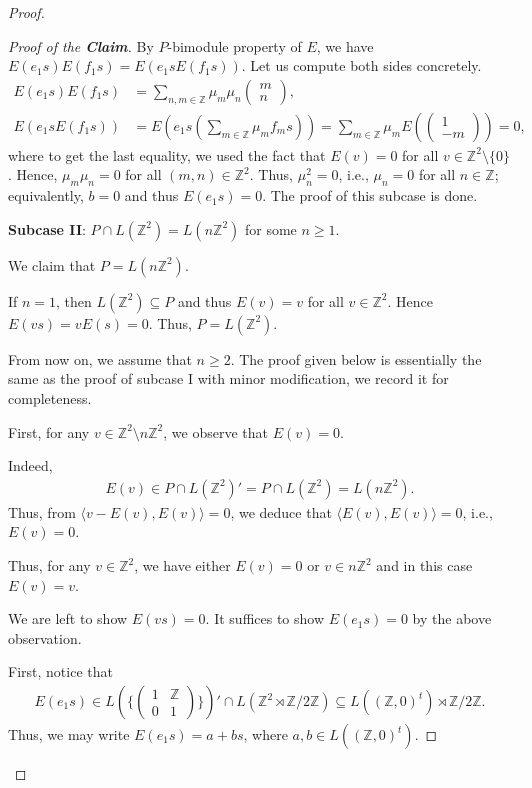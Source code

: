 \documentclass[12pt]{amsart}
\theoremstyle{definition}
\theoremstyle{remark}
\begin{document}
\begin{proof}
\begin{proof}[Proof of the \textbf{Claim}]
By $P$-bimodule property of $E$, we have $E(e_1s)E(f_1s)=E(e_1sE(f_1s))$. Let us compute both sides concretely.
\begin{align*}
E(e_1s)E(f_1s)&=\sum_{n, m\in\mathbb{Z}}\mu_m\mu_n\begin{pmatrix}
m\\n
\end{pmatrix} ,\\
E(e_1sE(f_1s))&=E(e_1s(\sum_{m\in\mathbb{Z}}\mu_mf_ms))=\sum_{m\in\mathbb{Z}}\mu_mE(\begin{pmatrix}
1\\
-m
\end{pmatrix})=0,
\end{align*}
where to get the last equality, we used the fact that $E(v)=0$ for all $v\in\mathbb{Z}^2\setminus\{0\}$.
Hence, $\mu_m\mu_n=0$ for all $(m, n)\in\mathbb{Z}^2$. Thus, $\mu_n^2=0$, i.e., $\mu_n=0$ for all $n\in\mathbb{Z}$; equivalently, $b=0$ and thus $E(e_1s)=0$. The proof of this subcase is done.

\textbf{Subcase II}: $P\cap L(\mathbb{Z}^2)=L(n\mathbb{Z}^2)$ for some $n\geq 1$.

We claim that $P=L(n\mathbb{Z}^2)$. 

If $n=1$, then $L(\mathbb{Z}^2)\subseteq P$ and thus $E(v)=v$ for all $v\in\mathbb{Z}^2$. Hence  $E(vs)=vE(s)=0$. Thus, $P=L(\mathbb{Z}^2)$.

From now on, we assume that $n\geq 2$.
The proof given below is essentially the same as the proof of subcase I with minor modification, we record it for completeness.

First, for any $v\in\mathbb{Z}^2\setminus {n\mathbb{Z}^2}$, we observe that $E(v)=0$.

Indeed, 
\begin{align*}
E(v)\in P\cap L(\mathbb{Z}^2)'=P\cap L(\mathbb{Z}^2)=L(n\mathbb{Z}^2).
\end{align*}
Thus, from $\langle v-E(v), E(v)\rangle=0$, we deduce that $\langle E(v), E(v) \rangle=0$, i.e., $E(v)=0$.

Thus, for any $v\in \mathbb{Z}^2$, we have either $E(v)=0$ or $v\in n\mathbb{Z}^2$ and in this case $E(v)=v$.

We are left to show $E(vs)=0$. It suffices to show $E(e_1s)=0$ by the above observation.

First, notice that
\begin{align*}
E(e_1s)\in L(\{\begin{pmatrix}
1&\mathbb{Z}\\
0&1
\end{pmatrix} \})'\cap L(\mathbb{Z}^2\rtimes \mathbb{Z}/{2\mathbb{Z}})\subseteq L((\mathbb{Z}, 0)^t)\rtimes \mathbb{Z}/{2\mathbb{Z}}.
\end{align*}
Thus, we may write $E(e_1s)=a+bs$, where $a, b\in L((\mathbb{Z}, 0)^t)$.


\end{proof}
\end{proof}
\end{document}
